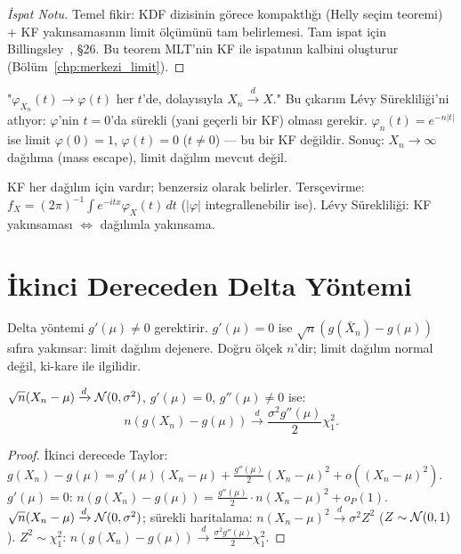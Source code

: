 \begin{proof}[İspat Notu]
Temel fikir: KDF dizisinin görece kompaktlığı (Helly seçim teoremi) + KF yakınsamasının
limit ölçümünü tam belirlemesi. Tam ispat için Billingsley~\cite{Billingsley1995}, §26.
Bu teorem MLT'nin KF ile ispatının kalbini oluşturur (Bölüm~\ref{chp:merkezi_limit}).
\end{proof}

\begin{hataanalizi}
"$\varphi_{X_n}(t) \to \varphi(t)$ her $t$'de, dolayısıyla $X_n \xrightarrow{d} X$."
Bu çıkarım Lévy Sürekliliği'ni atlıyor: $\varphi$'nin $t=0$'da sürekli (yani geçerli bir KF) olması
gerekir. $\varphi_n(t) = e^{-n|t|}$ ise limit $\varphi(0)=1$, $\varphi(t)=0$ ($t\neq0$) ---
bu bir KF değildir. Sonuç: $X_n \to \infty$ dağılıma (mass escape), limit dağılım mevcut değil.
\end{hataanalizi}

\begin{mikroozet}
KF her dağılım için vardır; benzersiz olarak belirler.
Tersçevirme: $f_X = (2\pi)^{-1}\int e^{-itx}\varphi_X(t)\,dt$ ($|\varphi|$ integrallenebilir ise).
Lévy Sürekliliği: KF yakınsaması $\Leftrightarrow$ dağılımla yakınsama.
\end{mikroozet}

\section{İkinci Dereceden Delta Yöntemi}
\label{sec:delta2}

\begin{motivasyon}
Delta yöntemi $g'(\mu) \neq 0$ gerektirir. $g'(\mu) = 0$ ise $\sqrt{n}(g(\bar{X}_n) - g(\mu))$
sıfıra yakınsar: limit dağılım dejenere. Doğru ölçek $n$'dir; limit dağılım normal değil,
ki-kare ile ilgilidir.
\end{motivasyon}

\begin{teorem}
\label{thm:delta2}
$\sqrt{n}(X_n - \mu) \xrightarrow{d} \mathcal{N}(0, \sigma^2)$, $g'(\mu) = 0$,
$g''(\mu) \neq 0$ ise:
\[
  n(g(X_n) - g(\mu)) \xrightarrow{d} \frac{\sigma^2 g''(\mu)}{2} \chi^2_1.
\]
\end{teorem}

\begin{proof}
İkinci derecede Taylor:
$g(X_n) - g(\mu) = g'(\mu)(X_n-\mu) + \tfrac{g''(\mu)}{2}(X_n-\mu)^2 + o((X_n-\mu)^2)$.
$g'(\mu) = 0$:
$n(g(X_n)-g(\mu)) = \tfrac{g''(\mu)}{2}\cdot n(X_n-\mu)^2 + o_P(1)$.
$\sqrt{n}(X_n-\mu) \xrightarrow{d} \mathcal{N}(0,\sigma^2)$;
sürekli haritalama: $n(X_n-\mu)^2 \xrightarrow{d} \sigma^2 Z^2$ ($Z \sim \mathcal{N}(0,1)$).
$Z^2 \sim \chi^2_1$: $n(g(X_n)-g(\mu)) \xrightarrow{d} \frac{\sigma^2 g''(\mu)}{2}\chi^2_1$.
\end{proof}

